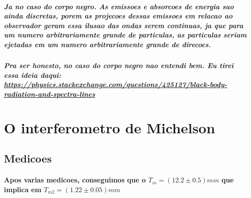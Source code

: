 \documentclass[12pt,twoside, a4paper, twocolumn]{article}
\begin{document}
\subparagraph*{Ja no caso do corpo negro. As emissoes e absorcoes de energia sao ainda discretas, porem as projecoes dessas emissoes em relacao ao observador geram essa ilusao das ondas serem continuas, ja que para um numero arbitrariamente grande de particulas, as particulas seriam ejetadas em um numero arbitrariamente grande de direcoes.}

\subparagraph*{Pra ser honesto, no caso do corpo negro nao entendi bem. Eu tirei essa ideia daqui: \url{https://physics.stackexchange.com/questions/425127/black-body-radiation-and-spectra-lines}}

\section{O interferometro de Michelson}

\subsection{Medicoes}

\paragraph*{Apos varias medicoes, conseguimos que o $T_{m} = (12.2 \pm 0.5)mm$ que implica em $T_{m2} = (1.22 \pm 0.05)mm$}
\end{document}
